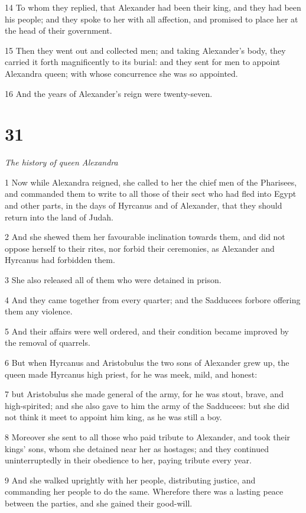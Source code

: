 14 To whom they replied, that Alexander had been their king, and they had been his people; and they spoke to her with all affection, and promised to place her at the head of their government.

15 Then they went out and collected men; and taking Alexander’s body, they carried it forth magnificently to its burial: and they sent for men to appoint Alexandra queen; with whose concurrence she was so appointed. 

16 And the years of Alexander’s reign were twenty-seven. 

\chapter{31}

\par \textit{The history of queen Alexandra}

1 Now while Alexandra reigned, she called to her the chief men of the Pharisees, and commanded them to write to all those of their sect who had fled into Egypt and other parts, in the days of Hyrcanus and of Alexander, that they should return into the land of Judah. 

2 And she shewed them her favourable inclination towards them, and did not oppose herself to their rites, nor forbid their ceremonies, as Alexander and Hyrcanus had forbidden them. 

3 She also released all of them who were detained in prison. 

4 And they came together from every quarter; and the Sadducees forbore offering them any violence. 

5 And their affairs were well ordered, and their condition became improved by the removal of quarrels. 

6 But when Hyrcanus and Aristobulus the two sons of Alexander grew up, the queen made Hyrcanus high priest, for he was meek, mild, and honest: 

7 but Aristobulus she made general of the army, for he was stout, brave, and high-spirited; and she also gave to him the army of the Sadducees: but she did not think it meet to appoint him king, as he was still a boy. 

8 Moreover she sent to all those who paid tribute to Alexander, and took their kings’ sons, whom she detained near her as hostages; and they continued uninterruptedly in their obedience to her, paying tribute every year. 

9 And she walked uprightly with her people, distributing justice, and commanding her people to do the same. Wherefore there was a lasting peace between the parties, and she gained their good-will. 

